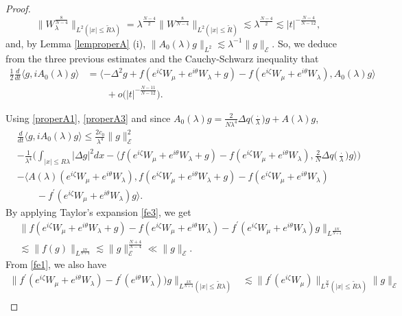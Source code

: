 \documentclass[a4paper,two-side,10pt]{amsart}
\numberwithin{equation}{section}
\begin{document}
\begin{proof}
$$\|W_\lambda^{\frac{8}{N-4}}\|_{L^2 (|x|\leq \tilde{R} \lambda)}=\lambda^{\frac{N-4}{2}} \|W^{\frac{8}{N-4}}\|_{L^2 (|x|\leq \tilde{R})}\lesssim \lambda^{\frac{N-4}{2}}\lesssim |t|^{-\frac{N-4}{N-12}},$$
and, by Lemma \ref{lemproperA} (i),
 $\|A_0 (\lambda) g\|_{L^2} \lesssim \lambda^{-1}\|g\|_{\mathcal{E}}.$
So, we deduce from the three previous estimates and the Cauchy-Schwarz inequality that
\begin{align*}
\frac{1}{2} \frac{d}{dt} \langle g, i A_0 (\lambda) g\rangle & = \langle - \Delta^2 g + f(e^{i\zeta}W_\mu +e^{i\theta} W_\lambda +g   )-   f(e^{i\zeta}W_\mu +e^{i\theta} W_\lambda ) , A_0 (\lambda )g \rangle\\
&\qquad
+o\big(|t|^{-\frac{N-11}{N-12}}\big) .
\end{align*}

Using \eqref{properA1}, \eqref{properA3} and since $A_0 (\lambda) g = \frac{2}{N\lambda^4}\Delta q \big(\frac{\cdot}{\lambda}\big) g +A(\lambda ) g$,
\begin{align*}
&\frac{d}{dt} \big\langle g, i A_0 (\lambda) g\big\rangle 
\leq \frac{2c_0}{\lambda^4} \|g\|_{\mathcal{E}}^2\\
&- \frac{1}{\lambda^4} \Big(\int_{|x|\leq R\lambda} |\Delta g|^2 dx -\big\langle f(e^{i\zeta}W_\mu +e^{i\theta} W_\lambda +g) - f(e^{i\zeta} W_\mu +e^{i\theta} W_\lambda), \frac{2}{N} \Delta q \big(\frac{\cdot}{\lambda} \big) g\big\rangle  \Big) \\
&-\big\langle A(\lambda) (e^{i\zeta} W_\mu +e^{i\theta} W_\lambda), f (e^{i\zeta} W_\mu +e^{i\theta} W_\lambda+g) - f(e^{i\zeta} W_\mu +e^{i\theta} W_\lambda)\\
&\qquad - f^\prime (e^{i\zeta} W_\mu +e^{i\theta} W_\lambda)g\big\rangle .
\end{align*}
By applying Taylor's expansion \eqref{fe3}, we get 
\begin{align*}
& \| f (e^{i\zeta}W_\mu +e^{i\theta} W_\lambda +g) - f (e^{i\zeta} W_\mu +e^{i\theta} W_\lambda )  - f^\prime (e^{i\zeta} W_\mu +e^{i\theta} W_\lambda) g \|_{L^{\frac{2N}{N+4}}}\\
& \lesssim \|f(g) \|_{L^{\frac{2N}{N+4}}}  \lesssim  \|g\|_{\mathcal{E}}^{\frac{N+4}{N-4}} \ll \|g \|_{\mathcal{E}}.
\end{align*}
From \eqref{fe1}, we also have
\begin{align*}
\|f^\prime (e^{i\zeta} W_\mu +e^{i\theta} W_\lambda) - f^\prime (e^{i\theta} W_\lambda))g \|_{L^{\frac{2N}{N+4}}(|x| \leq \tilde{R} \lambda) } & \lesssim \|f^\prime (e^{i\zeta} W_\mu)\|_{L^{\frac{N}{4}} (|x|\leq \tilde{R} \lambda)} \|g\|_{\mathcal{E}}\\

\end{align*}
\end{proof}
\end{document}
